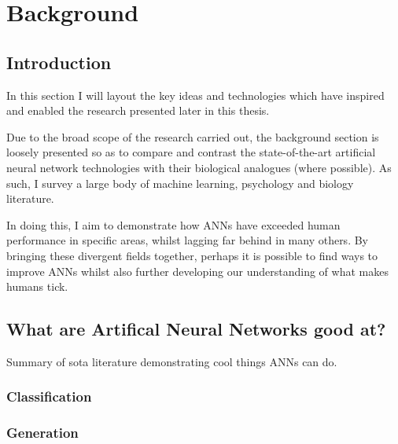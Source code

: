 
\chapter{Background} %

\label{Chapter2} %



\section{Introduction}\label{Lit:Intro}
In this section I will layout the key ideas and technologies which have inspired and enabled the research presented later in this thesis.

Due to the broad scope of the research carried out, the background section is loosely presented so as to compare and contrast the state-of-the-art artificial neural network technologies with their biological analogues (where possible). As such, I survey a large body of machine learning, psychology and biology literature.

In doing this, I aim to demonstrate how ANNs have exceeded human performance in specific areas, whilst lagging far behind in many others. By bringing these divergent fields together, perhaps it is possible to find ways to improve ANNs whilst also further developing our understanding of what makes humans tick. 


\section{What are Artifical Neural Networks good at?}
Summary of sota literature demonstrating cool things ANNs can do.
\subsection{Classification}
\subsection{Generation}
